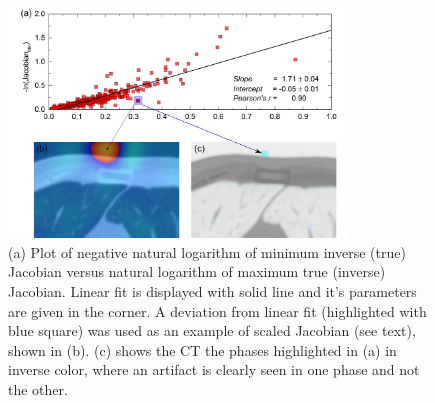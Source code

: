 \documentclass[type=dr, dr=rernat, accentcolor=tud7b,colorbacktitle, bigchapter, openright, twoside, 12pt ]{tudthesis}
\begin{document}
\begin{figure}[H]
	\begin{center}		
		\includegraphics[width=0.8\textwidth]{./Images/jacSum_lung.png}
		\caption{(a) Plot of negative natural logarithm of minimum inverse (true) Jacobian versus natural logarithm of maximum true (inverse) Jacobian. Linear fit is displayed with solid line and it's parameters are given in the corner. A deviation from linear fit (highlighted with blue square)
			was used as an example of scaled Jacobian (see text), shown in (b). (c) shows the CT the phases highlighted in (a) in inverse color, where an artifact is clearly seen in one phase and not the other.}
		\label{calcJac_lung}
	\end{center}
\end{figure}

\newpage
\end{document}
